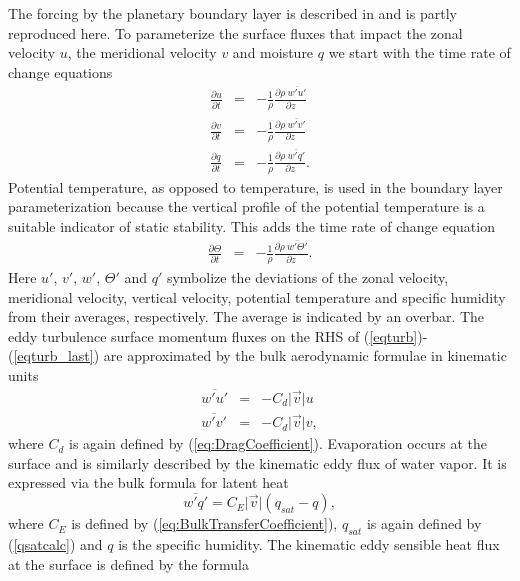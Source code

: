\documentclass[times,doublespace]{fldauth}
\begin{document}
{\begin{appendix}
The forcing by the planetary boundary layer is described in \cite{reed2012idealized} and is partly reproduced here.  To parameterize the surface fluxes that impact the zonal velocity $u$, the meridional velocity $v$ and moisture $q$ we start with the time rate of change equations
\begin{eqnarray}
\frac{\partial u}{\partial t} &=& - \frac{1}{\rho} \frac{\partial \rho \ \overline{w'u'}}{\partial z} \label{eqturb}  \\
\frac{\partial v}{\partial t} &=& - \frac{1}{\rho} \frac{\partial \rho \ \overline{w'v'}}{\partial z}  \label{eqturb_v} \\
\frac{\partial q}{\partial t} &=& - \frac{1}{\rho} \frac{\partial \rho \ \overline{w'q'}}{\partial z}.  \label{eqturb_last}
\end{eqnarray}  Potential temperature, as opposed to temperature, is used in the boundary layer parameterization because the vertical profile of the potential temperature is a suitable indicator of static stability.  This adds the time rate of change equation
\begin{eqnarray}
\frac{\partial \Theta}{\partial t} &=& - \frac{1}{\rho} \frac{\partial \rho \ \overline{w'\Theta'}}{\partial z}.
\end{eqnarray}  Here $u'$, $v'$, $w'$, $\Theta'$ and $q'$ symbolize the deviations of the zonal velocity, meridional velocity, vertical velocity, potential temperature and specific humidity from their averages, respectively. The average is indicated by an overbar.  The eddy turbulence surface momentum fluxes on the RHS of (\ref{eqturb})-(\ref{eqturb_last}) are approximated by the bulk aerodynamic formulae in kinematic units
\begin{eqnarray} \label{usurfflux}
\overline{w'u'} &=& -C_d \vert \vec{v} \vert u \\ 
\overline{w'v'} &=& -C_d \vert \vec{v} \vert v \label{vsurfflux},
\end{eqnarray} where $C_d$ is again defined by (\ref{eq:DragCoefficient}).  Evaporation occurs at the surface and is similarly described by the kinematic eddy flux of water vapor. It is expressed via the bulk formula for latent heat
\begin{equation} \label{lhflux}
\overline{w'q'} = C_E \vert \vec{v} \vert (q_{sat}-q),
\end{equation}
where $C_E$ is defined by (\ref{eq:BulkTransferCoefficient}), $q_{sat}$ is again defined by (\ref{qsatcalc}) and $q$ is the specific humidity.  The kinematic eddy sensible heat flux at the surface is defined by the formula

\end{appendix}}
\end{document}
